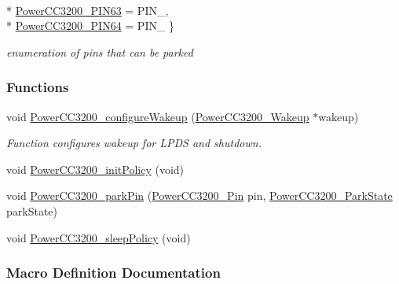 \begin{DoxyCompactItemize}
\\*
\hyperlink{_power_c_c3200_8h_a8b2018d283cb1a67825bd8dc13559536a4c6d65187deafd84a99eaa890cec5ba2}{Power\+C\+C3200\+\_\+\+P\+I\+N63} = P\+I\+N\+\_, 
\\*
\hyperlink{_power_c_c3200_8h_a8b2018d283cb1a67825bd8dc13559536ad16c8ce08db5b7e5371664fe74943731}{Power\+C\+C3200\+\_\+\+P\+I\+N64} = P\+I\+N\+\_
 \}
\begin{DoxyCompactList}\small\item\em enumeration of pins that can be parked \end{DoxyCompactList}\end{DoxyCompactItemize}
\subsubsection*{Functions}
\begin{DoxyCompactItemize}
\item 
void \hyperlink{_power_c_c3200_8h_a993d2d73356767768e849e24d72e9709}{Power\+C\+C3200\+\_\+configure\+Wakeup} (\hyperlink{struct_power_c_c3200___wakeup}{Power\+C\+C3200\+\_\+\+Wakeup} $\ast$wakeup)
\begin{DoxyCompactList}\small\item\em Function configures wakeup for L\+P\+D\+S and shutdown. \end{DoxyCompactList}\item 
void \hyperlink{_power_c_c3200_8h_ac8f5f6c1a02be91fba5231d9f955182e}{Power\+C\+C3200\+\_\+init\+Policy} (void)
\item 
void \hyperlink{_power_c_c3200_8h_ab39bdb92e0c20e89d6ebb5950e357c8a}{Power\+C\+C3200\+\_\+park\+Pin} (\hyperlink{_power_c_c3200_8h_a8b2018d283cb1a67825bd8dc13559536}{Power\+C\+C3200\+\_\+\+Pin} pin, \hyperlink{_power_c_c3200_8h_a352553cc06ecc6b8344d271bd27a0975}{Power\+C\+C3200\+\_\+\+Park\+State} park\+State)
\item 
void \hyperlink{_power_c_c3200_8h_ada8ba141d2aa30254feba0f088e47b87}{Power\+C\+C3200\+\_\+sleep\+Policy} (void)
\end{DoxyCompactItemize}


\subsubsection{Macro Definition Documentation}
